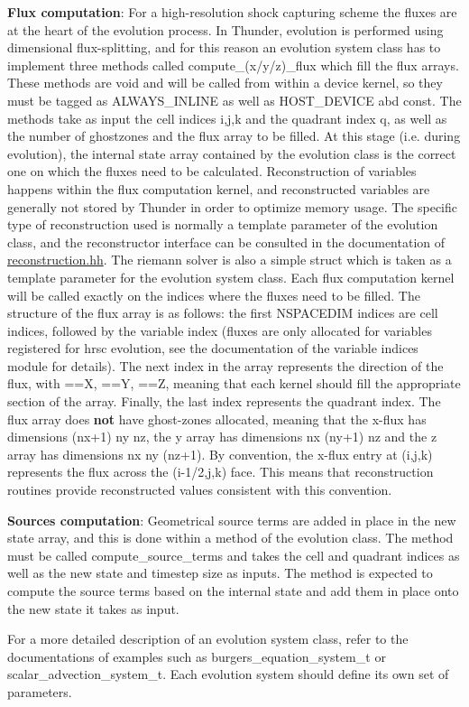 \begin{DoxyItemize}
\item {\bfseries{Flux computation}}\+: For a high-\/resolution shock capturing scheme the fluxes are at the heart of the evolution process. In Thunder, evolution is performed using dimensional flux-\/splitting, and for this reason an evolution system class has to implement three methods called {\ttfamily compute\+\_\+(x/y/z)\+\_\+flux} which fill the flux arrays. These methods are {\ttfamily void} and will be called from within a device kernel, so they must be tagged as {\ttfamily ALWAYS\+\_\+\+INLINE} as well as {\ttfamily HOST\+\_\+\+DEVICE} abd {\ttfamily const}. The methods take as input the cell indices {\ttfamily i,j,k} and the quadrant index {\ttfamily q}, as well as the number of ghostzones and the flux array to be filled. At this stage (i.\+e. during evolution), the internal state array contained by the evolution class is the correct one on which the fluxes need to be calculated. Reconstruction of variables happens within the flux computation kernel, and reconstructed variables are generally not stored by Thunder in order to optimize memory usage. The specific type of reconstruction used is normally a template parameter of the evolution class, and the reconstructor interface can be consulted in the documentation of {\ttfamily \mbox{\hyperlink{reconstruction_8hh_source}{reconstruction.\+hh}}}. The riemann solver is also a simple {\ttfamily struct} which is taken as a template parameter for the evolution system class. Each flux computation kernel will be called exactly on the indices where the fluxes need to be filled. The structure of the flux array is as follows\+: the first {\ttfamily NSPACEDIM} indices are cell indices, followed by the variable index (fluxes are only allocated for variables registered for hrsc evolution, see the documentation of the variable indices module for details). The next index in the array represents the direction of the flux, with {==X}, {==Y}, {==Z}, meaning that each kernel should fill the appropriate section of the array. Finally, the last index represents the quadrant index. The flux array does {\bfseries{not}} have ghost-\/zones allocated, meaning that the x-\/flux has dimensions {\ttfamily (nx+1) ny nz}, the y array has dimensions {\ttfamily nx (ny+1) nz} and the z array has dimensions {\ttfamily nx ny (nz+1)}. By convention, the x-\/flux entry at {\ttfamily (i,j,k)} represents the flux across the {\ttfamily (i-\/1/2,j,k)} face. This means that reconstruction routines provide reconstructed values consistent with this convention.
\item {\bfseries{Sources computation}}\+: Geometrical source terms are added in place in the new state array, and this is done within a method of the evolution class. The method must be called {\ttfamily compute\+\_\+source\+\_\+terms} and takes the cell and quadrant indices as well as the new state and timestep size as inputs. The method is expected to compute the source terms based on the internal state and add them in place onto the new state it takes as input.
\end{DoxyItemize}

For a more detailed description of an evolution system class, refer to the documentations of examples such as {\ttfamily burgers\+\_\+equation\+\_\+system\+\_\+t} or {\ttfamily scalar\+\_\+advection\+\_\+system\+\_\+t}. Each evolution system should define its own set of parameters. 